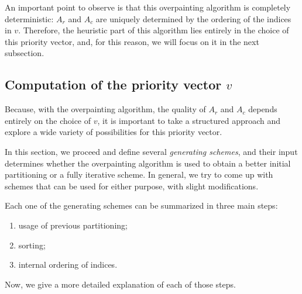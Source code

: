 An important point to observe is that this overpainting algorithm is completely deterministic: $A_r$ and $A_c$ are uniquely determined by the ordering of the indices in $v$. Therefore, the heuristic part of this algorithm lies entirely in the choice of this priority vector, and, for this reason, we will focus on it in the next subsection. 

\subsection{Computation of the priority vector $v$}

Because, with the overpainting algorithm, the quality of $A_r$ and $A_c$ depends entirely on the choice of $v$, it is important to take a structured approach and explore a wide variety of possibilities for this priority vector.

In this section, we proceed and define several \emph{generating schemes}, and their input determines whether the overpainting algorithm is used to obtain a better initial partitioning or a fully iterative scheme. In general, we try to come up with schemes that can be used for either purpose, with slight modifications. 

Each one of the generating schemes can be summarized in three main steps:

\begin{enumerate}
	\item usage of previous partitioning;
	\item sorting;
	\item internal ordering of indices.
\end{enumerate}

Now, we give a more detailed explanation of each of those steps. 

